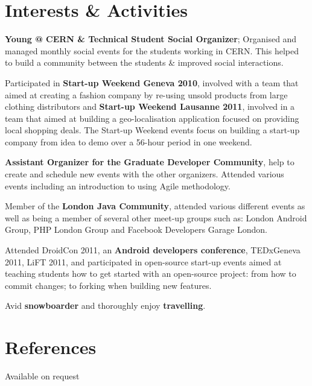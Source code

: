 \documentclass[final,a4paper,notitlepage,10pt]{article}
\begin{document}
\section*{Interests \& Activities {\hfill\raisebox{.5ex}{\makebox[.65\textwidth]{\hrulefill}}}}
\begin{compactitemize}
\item \textbf{Young @ CERN \& Technical Student Social Organizer}; Organised and managed monthly social events for the students working in CERN. This helped to build a community between the students \& improved social interactions.
\item Participated in \textbf{Start-up Weekend Geneva 2010}, involved with a team that aimed at creating a fashion company by re-using unsold products from large clothing distributors and \textbf{Start-up Weekend Lausanne 2011}, involved in a team that aimed at building a geo-localisation application focused on providing local shopping deals. The Start-up Weekend events focus on building a start-up company from idea to demo over a 56-hour period in one weekend.
\item \textbf{Assistant Organizer for the Graduate Developer Community}, help to create and schedule new events with the other organizers. Attended various events including an introduction to using Agile methodology.
\item Member of the \textbf{London Java Community}, attended various different events as well as being a member of several other meet-up groups such as: London Android Group, PHP London Group and Facebook Developers Garage London.
\item Attended DroidCon 2011, an \textbf{Android developers conference}, TEDxGeneva 2011, LiFT 2011, and participated in open-source start-up events aimed at teaching students how to get started with an open-source project: from how to commit changes; to forking when building new features.
\item Avid \textbf{snowboarder} and thoroughly enjoy \textbf{travelling}.
\end{compactitemize}

\section*{References {\hfill\raisebox{.5ex}{\makebox[.65\textwidth]{\hrulefill}}}}
Available on request
\end{document}
